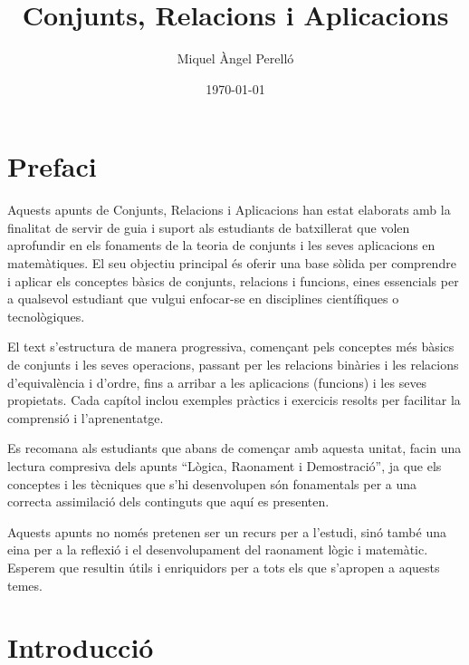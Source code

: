\documentclass[12pt,a4paper,oneside]{book}
\theoremstyle{plain}
\theoremstyle{definition}
\theoremstyle{remark}
\numberwithin{equation}{section}
\begin{document}
\frontmatter
\title{Conjunts, Relacions i Aplicacions}
\author{Miquel Àngel Perelló}
\date{\today}
\maketitle
\tableofcontents
\frontmatter

\pagecolor{fons!20}

\let\cleardoublepage\clearpage

\chapter*{Prefaci}

Aquests apunts de Conjunts, Relacions i Aplicacions han estat elaborats amb la finalitat de servir de guia i suport als estudiants de batxillerat que volen aprofundir en els fonaments de la teoria de conjunts i les seves aplicacions en matemàtiques. El seu objectiu principal és oferir una base sòlida per comprendre i aplicar els conceptes bàsics de conjunts, relacions i funcions, eines essencials per a qualsevol estudiant que vulgui enfocar-se en disciplines científiques o tecnològiques.

\bigskip

El text s’estructura de manera progressiva, començant pels conceptes més bàsics de conjunts i les seves operacions, passant per les relacions binàries i les relacions d’equivalència i d’ordre, fins a arribar a les aplicacions (funcions) i les seves propietats. Cada capítol inclou exemples pràctics i exercicis resolts per facilitar la comprensió i l’aprenentatge.

\bigskip

Es recomana als estudiants que abans de començar amb aquesta unitat, facin una lectura compresiva dels apunts “Lògica, Raonament i Demostració”, ja que els conceptes i les tècniques que s’hi desenvolupen són fonamentals per a una correcta assimilació dels continguts que aquí es presenten.

\bigskip

Aquests apunts no només pretenen ser un recurs per a l’estudi, sinó també una eina per a la reflexió i el desenvolupament del raonament lògic i matemàtic. Esperem que resultin útils i enriquidors per a tots els que s’apropen a aquests temes.

\let\cleardoublepage\clearpage

\chapter{Introducci\'{o}}
\end{document}
